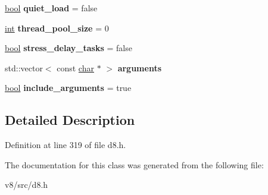 \begin{DoxyCompactItemize}
\mbox{\hyperlink{classbool}{bool}} {\bfseries quiet\+\_\+load} = false
\item 
\mbox{\label{classv8_1_1ShellOptions_afea2c8136e7091fdc786820fd9dab1c8}} 
\mbox{\hyperlink{classint}{int}} {\bfseries thread\+\_\+pool\+\_\+size} = 0
\item 
\mbox{\label{classv8_1_1ShellOptions_adb1f99175cce6f5a7c40b342d081a510}} 
\mbox{\hyperlink{classbool}{bool}} {\bfseries stress\+\_\+delay\+\_\+tasks} = false
\item 
\mbox{\label{classv8_1_1ShellOptions_ad94113a9ac6fdc8e21a12c43bc8b009d}} 
std\+::vector$<$ const \mbox{\hyperlink{classchar}{char}} $\ast$ $>$ {\bfseries arguments}
\item 
\mbox{\label{classv8_1_1ShellOptions_adc3ddb760faf33d4b4184d537262c0d8}} 
\mbox{\hyperlink{classbool}{bool}} {\bfseries include\+\_\+arguments} = true
\end{DoxyCompactItemize}


\subsection{Detailed Description}


Definition at line 319 of file d8.\+h.



The documentation for this class was generated from the following file\+:\begin{DoxyCompactItemize}
\item 
v8/src/d8.\+h\end{DoxyCompactItemize}
